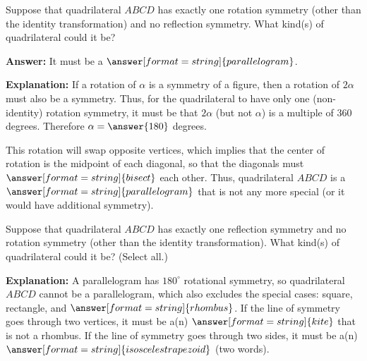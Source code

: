 \documentclass[nooutcomes]{ximera}
\begin{document}
\begin{question}
Suppose that quadrilateral $ABCD$ has exactly one rotation symmetry (other than the identity transformation) and no reflection symmetry.  What kind(s) of quadrilateral could it be?  

\textbf{Answer:}  It must be a $\answer[format=string]{parallelogram}$.
\begin{question}
\textbf{Explanation:} If a rotation of $\alpha$ is a symmetry of a figure, then a rotation of $2\alpha$ must also be a symmetry.  Thus, for the quadrilateral to have only one (non-identity) rotation symmetry, it must be that $2\alpha$ (but not $\alpha$) is a multiple of 360 degrees.  Therefore $\alpha = \answer{180}$ degrees.  

This rotation will swap opposite vertices, which implies that the center of rotation is the midpoint of each diagonal, so that the diagonals must $\answer[format=string]{bisect}$ each other.  Thus, quadrilateral $ABCD$ is a $\answer[format=string]{parallelogram}$ that is not any more special (or it would have additional symmetry).  
\end{question}
\end{question}

\begin{question}
Suppose that quadrilateral $ABCD$ has exactly one reflection symmetry and no rotation symmetry (other than the identity transformation).  What kind(s) of quadrilateral could it be? (Select all.)
\begin{selectAll} 
\end{selectAll}
\begin{question}
\textbf{Explanation:}  A parallelogram has $180^\circ$ rotational symmetry, so quadrilateral $ABCD$ cannot be a parallelogram, which also excludes the special cases: square, rectangle, 
and $\answer[format=string]{rhombus}$.  If the line of symmetry goes through two vertices, it must be a(n) $\answer[format=string]{kite}$ that is not a rhombus.  If the line of symmetry goes through two sides, it must be a(n) $\answer[format=string]{isosceles trapezoid}$ (two words).  
\end{question}
\end{question}
\end{document}
